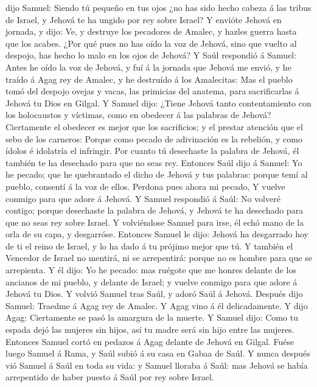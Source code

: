dijo Samuel: Siendo tú pequeño en tus ojos ¿no has sido hecho cabeza á
las tribus de Israel, y Jehová te ha ungido por rey sobre Israel?
 Y envióte Jehová en jornada, y dijo: Ve, y destruye los
pecadores de Amalec, y hazles guerra hasta que los acabes. 
¿Por qué pues no has oído la voz de Jehová, sino que vuelto al despojo,
has hecho lo malo en los ojos de Jehová?  Y Saúl respondió
á Samuel: Antes he oído la voz de Jehová, y fuí á la jornada que Jehová
me envió, y he traído á Agag rey de Amalec, y he destruído á los
Amalecitas:  Mas el pueblo tomó del despojo ovejas y vacas,
las primicias del anatema, para sacrificarlas á Jehová tu Dios en
Gilgal.  Y Samuel dijo: ¿Tiene Jehová tanto contentamiento
con los holocaustos y víctimas, como en obedecer á las palabras de
Jehová? Ciertamente el obedecer es mejor que los sacrificios; y el
prestar atención que el sebo de los carneros:  Porque como
pecado de adivinación es la rebelión, y como ídolos é idolatría el
infringir. Por cuanto tú desechaste la palabra de Jehová, él también te
ha desechado para que no seas rey.  Entonces Saúl dijo á
Samuel: Yo he pecado; que he quebrantado el dicho de Jehová y tus
palabras: porque temí al pueblo, consentí á la voz de ellos. Perdona
pues ahora mi pecado,  Y vuelve conmigo para que adore á
Jehová.  Y Samuel respondió á Saúl: No volveré contigo;
porque desechaste la palabra de Jehová, y Jehová te ha desechado para
que no seas rey sobre Israel.  Y volviéndose Samuel para
irse, él echó mano de la orla de su capa, y desgarróse. 
Entonces Samuel le dijo: Jehová ha desgarrado hoy de ti el reino de
Israel, y lo ha dado á tu prójimo mejor que tú.  Y también
el Vencedor de Israel no mentirá, ni se arrepentirá: porque no es hombre
para que se arrepienta.  Y él dijo: Yo he pecado: mas
ruégote que me honres delante de los ancianos de mi pueblo, y delante de
Israel; y vuelve conmigo para que adore á Jehová tu Dios. 
Y volvió Samuel tras Saúl, y adoró Saúl á Jehová.  Después
dijo Samuel: Traedme á Agag rey de Amalec. Y Agag vino á él
delicadamente. Y dijo Agag: Ciertamente se pasó la amargura de la
muerte.  Y Samuel dijo: Como tu espada dejó las mujeres sin
hijos, así tu madre será sin hijo entre las mujeres. Entonces Samuel
cortó en pedazos á Agag delante de Jehová en Gilgal.  Fuése
luego Samuel á Rama, y Saúl subió á su casa en Gabaa de Saúl.
 Y nunca después vió Samuel á Saúl en toda su vida: y
Samuel lloraba á Saúl: mas Jehová se había arrepentido de haber puesto á
Saúl por rey sobre Israel.

